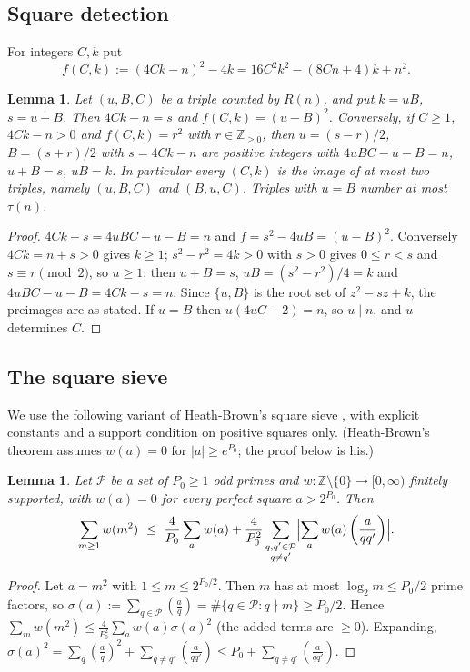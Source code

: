 \documentclass[11pt,reqno]{amsart}
\newtheorem{lemma}[theorem]{Lemma}
\theoremstyle{definition}
\newcommand{\Z}{\mathbb Z}
\newcommand{\leg}[2]{\left(\frac{#1}{#2}\right)}
\newcommand{\cP}{\mathcal P}
\begin{document}
\subsection{Square detection}
For integers $C,k$ put
\begin{equation}\label{eq:fdef}
 f(C,k):=(4Ck-n)^2-4k=16C^2k^2-(8Cn+4)k+n^2 .
\end{equation}

\begin{lemma}\label{lem:detect}
Let $(u,B,C)$ be a triple counted by $R(n)$, and put $k=uB$, $s=u+B$.
Then $4Ck-n=s$ and $f(C,k)=(u-B)^2$.  Conversely, if $C\ge1$, $4Ck-n>0$
and $f(C,k)=r^2$ with $r\in\Z_{\ge0}$, then $u=(s-r)/2$, $B=(s+r)/2$ with
$s=4Ck-n$ are positive integers with $4uBC-u-B=n$, $u+B=s$, $uB=k$.  In
particular every $(C,k)$ is the image of at most two triples, namely
$(u,B,C)$ and $(B,u,C)$.  Triples with $u=B$ number at most $\tau(n)$.
\end{lemma}
\begin{proof}
$4Ck-s=4uBC-u-B=n$ and $f=s^2-4uB=(u-B)^2$.  Conversely $4Ck=n+s>0$
gives $k\ge1$; $s^2-r^2=4k>0$ with $s>0$ gives $0\le r<s$ and
$s\equiv r\pmod 2$, so $u\ge1$; then $u+B=s$, $uB=(s^2-r^2)/4=k$ and
$4uBC-u-B=4Ck-s=n$.  Since $\{u,B\}$ is the root set of
$z^2-sz+k$, the preimages are as stated.  If $u=B$ then
$u(4uC-2)=n$, so $u\mid n$, and $u$ determines $C$.
\end{proof}

\subsection{The square sieve}
We use the following variant of Heath-Brown's square sieve
\cite[Thm.~1]{HB84}, with explicit constants and a support condition on
positive squares only.  (Heath-Brown's theorem assumes $w(a)=0$ for
$|a|\ge e^{P_0}$; the proof below is his.)

\begin{lemma}\label{lem:sqsieve}
Let $\cP$ be a set of $P_0\ge1$ odd primes and
$w:\Z\setminus\{0\}\to[0,\infty)$ finitely supported, with $w(a)=0$ for
every perfect square $a>2^{P_0}$.  Then
\[
 \sum_{m\ge1}w(m^2)\ \le\ \frac4{P_0}\sum_a w(a)
 +\frac4{P_0^2}\sum_{\substack{q,q'\in\cP\\ q\neq q'}}
 \Bigl|\sum_a w(a)\leg{a}{qq'}\Bigr| .
\]
\end{lemma}
\begin{proof}
Let $a=m^2$ with $1\le m\le 2^{P_0/2}$.  Then $m$ has at most
$\log_2m\le P_0/2$ prime factors, so
$\sigma(a):=\sum_{q\in\cP}\leg aq=\#\{q\in\cP:q\nmid m\}\ge P_0/2$.  Hence
$\sum_mw(m^2)\le\frac4{P_0^2}\sum_aw(a)\sigma(a)^2$ (the added terms are
$\ge0$).  Expanding,
$\sigma(a)^2=\sum_q\leg aq^2+\sum_{q\ne q'}\leg a{qq'}\le
P_0+\sum_{q\ne q'}\leg a{qq'}$.
\end{proof}
\end{document}
